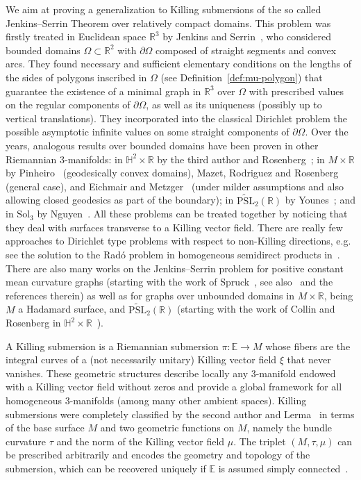 \documentclass[a4paper,10pt,reqno]{amsart}
\newcommand{\R}{\mathbb{R}}
\newcommand{\E}{\mathbb{E}}
\theoremstyle{definition}
\theoremstyle{remark}
\numberwithin{equation}{section}
\begin{document}
We aim at proving a generalization to Killing submersions of the so called Jenkins--Serrin Theorem over relatively compact domains. This problem was firstly treated in Euclidean space $\R^3$ by Jenkins and Serrin~\cite[Thm.~3 and~4]{JS}, who considered bounded domains $\Omega\subset\R^2$ with $\partial\Omega$ composed of straight segments and convex arcs. They found necessary and sufficient elementary conditions on the lengths of the sides of polygons inscribed in $\Omega$ (see Definition~\ref{def:mu-polygon}) that guarantee the existence of a minimal graph in $\R^3$ over $\Omega$ with prescribed values on the regular components of $\partial\Omega$, as well as its uniqueness (possibly up to vertical translations). They incorporated into the classical Dirichlet problem the possible asymptotic infinite values on some straight components of $\partial\Omega$. Over the years, analogous results over bounded domains have been proven in other Riemannian 3-manifolds: in $\mathbb H^2\times\R$ by the third author and Rosenberg~\cite{NR,NR-err}; in $M\times\R$ by Pinheiro~\cite{Pin} (geodesically convex domains), Mazet, Rodriguez and Rosenberg~\cite{MRR} (general case), and Eichmair and Metzger~\cite{EM} (under milder assumptions and also allowing closed geodesics as part of the boundary); in $\widetilde{\mathrm{PSL}}_2(\R)$ by Younes~\cite{Younes}; and in $\mathrm{Sol}_3$ by Nguyen~\cite{Ng}. All these problems can be treated together by noticing that they deal with surfaces transverse to a Killing vector field. There are really few approaches to Dirichlet type problems with respect to non-Killing directions, e.g. see the solution to the Radó problem in homogeneous semidirect products in~\cite{MMP}. There are also many works on the Jenkins--Serrin problem for positive constant mean curvature graphs (starting with the work of Spruck~\cite{Spruck}, see also~\cite{EM} and the references therein) as well as for graphs over unbounded domains in $M\times\R$, being $M$ a Hadamard surface, and $\widetilde{\mathrm{PSL}}_2(\R)$ (starting with the work of Collin and Rosenberg in $\mathbb{H}^2\times\mathbb{R}$~\cite{CR}).

A Killing submersion is a Riemannian submersion $\pi:\mathbb{E}\to M$ whose fibers are the integral curves of a (not necessarily unitary) Killing vector field $\xi$ that never vanishes. These geometric structures describe locally any $3$-manifold endowed with a Killing vector field without zeros and provide a global framework for all homogeneous $3$-manifolds (among many other ambient spaces). Killing submersions were completely classified by the second author and Lerma~\cite{LerMan} in terms of the base surface $M$ and two geometric functions on $M$, namely the bundle curvature $\tau$ and the norm of the Killing vector field $\mu$. The triplet $(M,\tau,\mu)$ can be prescribed arbitrarily and encodes the geometry and topology of the submersion, which can be recovered uniquely if $\E$ is assumed simply connected~\cite[Thm.~2.6 and~2.9]{LerMan}.
\end{document}
